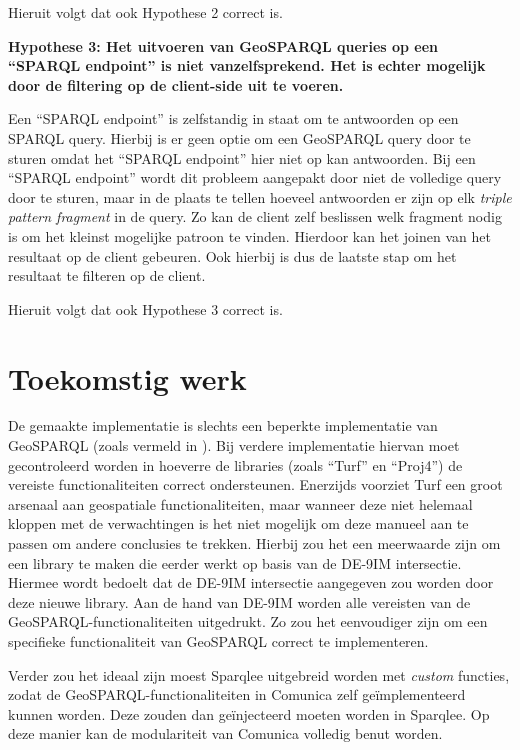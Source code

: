 Hieruit volgt dat ook Hypothese 2 correct is.

\textbf{Hypothese 3: Het uitvoeren van GeoSPARQL queries op een ``SPARQL endpoint'' is niet vanzelfsprekend. Het is echter mogelijk door de filtering op de client-side uit te voeren.}

Een ``SPARQL endpoint'' is zelfstandig in staat om te antwoorden op een SPARQL query. Hierbij is er geen optie om een GeoSPARQL query door te sturen omdat het ``SPARQL endpoint'' hier niet op kan antwoorden. Bij een ``SPARQL endpoint'' wordt dit probleem aangepakt door niet de volledige query door te sturen, maar in de plaats te tellen hoeveel antwoorden er zijn op elk \textit{triple pattern fragment} in de query. Zo kan de client zelf beslissen welk fragment nodig is om het kleinst mogelijke patroon te vinden. Hierdoor kan het joinen van het resultaat op de client gebeuren. Ook hierbij is dus de laatste stap om het resultaat te filteren op de client. 

Hieruit volgt dat ook Hypothese 3 correct is.

\section{Toekomstig werk}

De gemaakte implementatie is slechts een beperkte implementatie van GeoSPARQL (zoals vermeld in ). Bij verdere implementatie hiervan moet gecontroleerd worden in hoeverre de libraries (zoals ``Turf'' en ``Proj4'') de vereiste functionaliteiten correct ondersteunen. Enerzijds voorziet Turf een groot arsenaal aan geospatiale functionaliteiten, maar wanneer deze niet helemaal kloppen met de verwachtingen is het niet mogelijk om deze manueel aan te passen om andere conclusies te trekken. Hierbij zou het een meerwaarde zijn om een library te maken die eerder werkt op basis van de DE-9IM intersectie. Hiermee wordt bedoelt dat de DE-9IM intersectie aangegeven zou worden door deze nieuwe library. Aan de hand van DE-9IM worden alle vereisten van de GeoSPARQL-functionaliteiten uitgedrukt. Zo zou het eenvoudiger zijn om een specifieke functionaliteit van GeoSPARQL correct te implementeren. 

Verder zou het ideaal zijn moest Sparqlee uitgebreid worden met \textit{custom} functies, zodat de GeoSPARQL-functionaliteiten in Comunica zelf geïmplementeerd kunnen worden. Deze zouden dan geïnjecteerd moeten worden in Sparqlee. Op deze manier kan de modulariteit van Comunica volledig benut worden.

